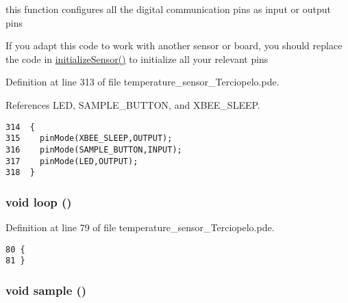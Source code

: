 this function configures all the digital communication pins as input or output pins 

If you adapt this code to work with another sensor or board, you should replace the code in \hyperlink{temperature__sensor__board__v2_8h_f6c9587ccbcf223f8c79f508c2fef366}{initializeSensor()} to initialize all your relevant pins 

Definition at line 313 of file temperature\_\-sensor\_\-Terciopelo.pde.

References LED, SAMPLE\_\-BUTTON, and XBEE\_\-SLEEP.

\begin{Code}\begin{verbatim}314  {
315    pinMode(XBEE_SLEEP,OUTPUT);
316    pinMode(SAMPLE_BUTTON,INPUT);
317    pinMode(LED,OUTPUT);
318  }  
\end{verbatim}
\end{Code}


\hypertarget{temperature__sensor___terciopelo_8pde_fe461d27b9c48d5921c00d521181f12f}{
\subsubsection[{loop}]{\setlength{\rightskip}{0pt plus 5cm}void loop ()}}
\label{temperature__sensor___terciopelo_8pde_fe461d27b9c48d5921c00d521181f12f}




Definition at line 79 of file temperature\_\-sensor\_\-Terciopelo.pde.

\begin{Code}\begin{verbatim}80 {
81 }
\end{verbatim}
\end{Code}


\hypertarget{temperature__sensor___terciopelo_8pde_50a2ce599e896bfb535e70a42003ed23}{
\subsubsection[{sample}]{\setlength{\rightskip}{0pt plus 5cm}void sample ()}}
\label{temperature__sensor___terciopelo_8pde_50a2ce599e896bfb535e70a42003ed23}




